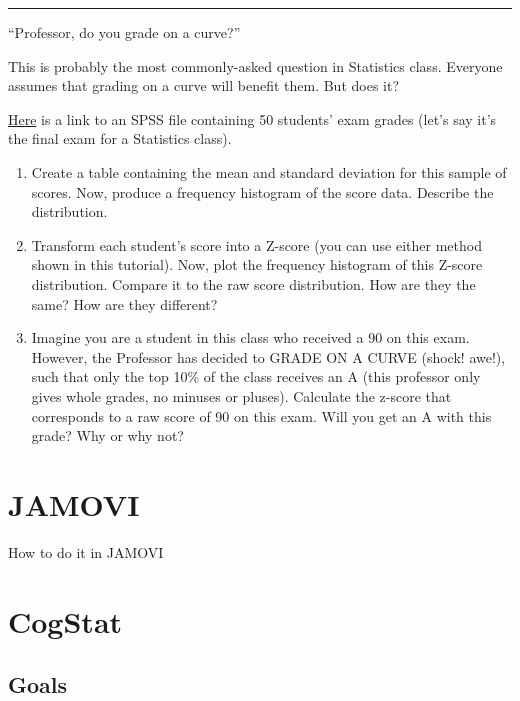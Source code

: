 \documentclass[
]{book}
\begin{document}
\begin{center}\rule{0.5\linewidth}{0.5pt}\end{center}

``Professor, do you grade on a curve?''

This is probably the most commonly-asked question in Statistics class. Everyone assumes that grading on a curve will benefit them. But does it?

\href{https://github.com/CrumpLab/statisticsLab/blob/master/data/spssdata/StatsGrades.sav}{Here} is a link to an SPSS file containing 50 students' exam grades (let's say it's the final exam for a Statistics class).

\begin{enumerate}
\def\labelenumi{\arabic{enumi}.}
\item
  Create a table containing the mean and standard deviation for this sample of scores. Now, produce a frequency histogram of the score data. Describe the distribution.
\item
  Transform each student's score into a Z-score (you can use either method shown in this tutorial). Now, plot the frequency histogram of this Z-score distribution. Compare it to the raw score distribution. How are they the same? How are they different?
\item
  Imagine you are a student in this class who received a 90 on this exam. However, the Professor has decided to GRADE ON A CURVE (shock! awe!), such that only the top 10\% of the class receives an A (this professor only gives whole grades, no minuses or pluses). Calculate the z-score that corresponds to a raw score of 90 on this exam. Will you get an A with this grade? Why or why not?
\end{enumerate}

\hypertarget{jamovi-4}{%
\section{JAMOVI}\label{jamovi-4}}

How to do it in JAMOVI

\hypertarget{cogstat-5}{%
\section{CogStat}\label{cogstat-5}}

\hypertarget{goals-3}{%
\subsection{Goals}\label{goals-3}}
\end{document}
